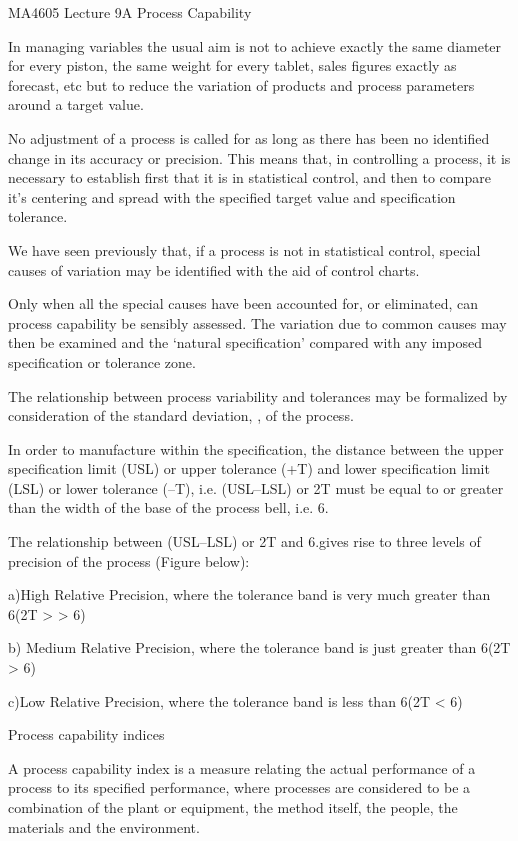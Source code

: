 MA4605 Lecture 9A Process Capability

In managing variables the usual aim is not to achieve exactly the same diameter for every piston, the same weight for every tablet, sales figures exactly as forecast, etc but to reduce the variation of products and process parameters around a target value. 

No adjustment of a process is called for as long as there has been no identified change in its accuracy or precision. This means that, in controlling a process, it is necessary to establish first that it is in statistical control, and then to compare it’s centering and spread with the specified target value and specification tolerance.

We have seen previously that, if a process is not in statistical control, special causes of variation may be identified with the aid of control charts. 

Only when all the special causes have been accounted for, or
eliminated, can process capability be sensibly assessed. The variation due to common causes may then be examined and the ‘natural specification’ compared with any imposed specification or tolerance zone.

The relationship between process variability and tolerances may be formalized by consideration of the standard deviation, \sigma, of the process. 

In order to manufacture within the specification, the distance between the upper specification limit (USL) or upper tolerance (+T) and lower specification limit (LSL) or lower tolerance (–T), i.e. (USL–LSL) or 2T must be equal to or greater than the width of the base of the process bell, i.e. 6\sigma.
 
The relationship between (USL–LSL) or 2T and 6\sigma.gives rise
to three levels of precision of the process (Figure below):




a)High Relative Precision, where the tolerance band is very much greater
than 6\sigma (2T > > 6\sigma) 

b) Medium Relative Precision, where the tolerance band is just greater than
6\sigma (2T > 6\sigma) 

c)Low Relative Precision, where the tolerance band is less than
6\sigma (2T < 6\sigma)
 
 

Process capability indices

A process capability index is a measure relating the actual performance of a process to its specified performance, where processes are considered to be a combination of the plant or equipment, the method itself, the people, the materials and the environment. 


